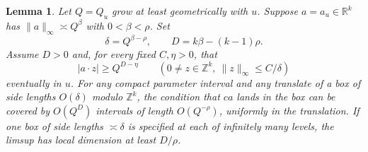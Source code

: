 \documentclass[11pt,reqno,a4paper]{amsart}
\newtheorem{lemma}[theorem]{Lemma}
\theoremstyle{remark}
\begin{document}
\begin{lemma}\label{lem:met-segment}
Let \(Q=Q_u\) grow at least geometrically with \(u\). Suppose
\(a=a_u\in\mathbb R^k\) has \(\|a\|_\infty\asymp Q^\beta\) with
\(0<\beta<\rho\). Set
\[
 \delta=Q^{\beta-\rho},
 \qquad D=k\beta-(k-1)\rho.
\]
Assume \(D>0\) and, for every fixed \(C,\eta>0\), that
\[
 |a\cdot z|\geq Q^{D-\eta}\qquad
 (0\ne z\in\mathbb Z^k,\ \|z\|_\infty\leq C/\delta)
\]
eventually in \(u\). For any compact parameter interval and any
translate of a box of side lengths \(O(\delta)\) modulo
\(\mathbb Z^k\), the condition that \(ca\) lands in the box can be
covered by \(O(Q^D)\) intervals of length \(O(Q^{-\rho})\), uniformly
in the translation. If one box of side lengths \(\asymp\delta\) is
specified at each of infinitely many levels, the limsup has local
dimension at least \(D/\rho\).
\end{lemma}
\end{document}
